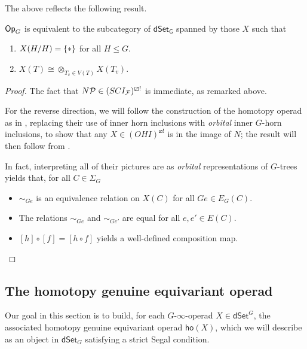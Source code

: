 \documentclass[a4paper,10pt
,draft
]{article}%
\renewcommand{\F}{\mathcal F}
\renewcommand{\1}{\eta}%
\begin{document}
The above reflects the following result.

\begin{proposition}
      $\mathsf{Op}_G$ is equivalent to the subcategory of $\mathsf{dSet_G}$ spanned by those $X$ such that
      \begin{enumerate}
      \item $X(H/H) = \set{\**}$ for all $H \leq G$.
      \item $X(T) \cong \otimes_{T_v \in V(T)}X(T_v)$. 
      \end{enumerate}
\end{proposition}
\begin{proof}
      The fact that $N\P \in (SCI_{\F})^{\boxslash !}$ is immediate, as remarked above.

      For the reverse direction, we will follow the construction of the homotopy operad as in \cite[\S 6]{MW09},
      replacing their use of inner horn inclusions with \textit{orbital} inner $G$-horn inclusions,
      to show that any $X \in (OHI)^{\boxslash !}$ is in the image of $N$; 
      the result will then follow from \cite[HYPER PROP]{BP_edss}.

      In fact, interpreting all of their pictures are as \textit{orbital} representations of $G$-trees yields that,
      for all $C \in \Sigma_G$
      \begin{itemize}
      \item $\sim_{G e}$ is an equivalence relation on $X(C)$ for all $Ge \in E_G(C)$.
      \item The relations $\sim_{G e}$ and $\sim_{G e'}$ are equal for all $e,e'\in E(C)$.
      \item $[h] \circ [f] = [h \circ f]$ yields a well-defined composition map.
      \end{itemize}
\end{proof}



\newpage

\subsection{The homotopy genuine equivariant operad}


Our goal in this section is to build,
for each $G$-$\infty$-operad $X \in \mathsf{dSet}^G$,
the associated homotopy genuine equivariant operad
$\mathsf{ho} (X)$,
which we will describe as an object in
$\mathsf{dSet}_G$
satisfying a strict Segal condition.
\end{document}

